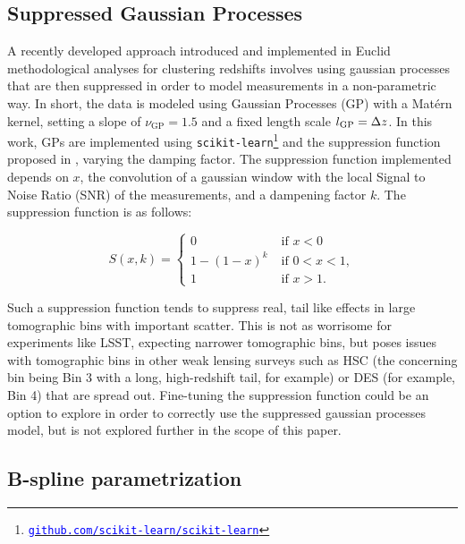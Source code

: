 \subsection{Suppressed Gaussian Processes}
\label{sec:parametrization:sgp}

A recently developed approach introduced and implemented in Euclid methodological analyses for clustering redshifts \cite{EuclidClusteringRedshifts2023, EuclidClusterRedshifts2025} involves using gaussian processes that are then suppressed in order to model measurements in a non-parametric way. In short, the data is modeled using Gaussian Processes (GP) with a Matérn kernel, setting a slope of $\nu_{\mathrm{GP}}=1.5$ and a fixed length scale $l_{\mathrm{GP}}=\Delta z$. In this work, GPs are implemented using \texttt{scikit-learn}\footnote{\href{https://github.com/scikit-learn/scikit-learn}{\textcolor{blue}{\texttt{github.com/scikit-learn/scikit-learn}}}} \cite{ScikitLearnPedregosa2011} and the suppression function proposed in \cite{EuclidClusteringRedshifts2023, EuclidClusterRedshifts2025}, varying the damping factor. The suppression function implemented depends on $x$, the convolution of a gaussian window with the local Signal to Noise Ratio (SNR) of the measurements, and a dampening factor $k$. The suppression function is as follows:

\begin{equation}\label{eq:suppression_function}
S(x, k) =
\begin{cases}
0 & \text{if } x < 0 \\
1 - (1 - x)^k\; & \text{if } 0 < x < 1, \\
1 & \text{if } x > 1.
\end{cases}
\end{equation}

Such a suppression function tends to suppress real, tail like effects in large tomographic bins with important scatter. This is not as worrisome for experiments like LSST, expecting narrower tomographic bins, but poses issues with tomographic bins in other weak lensing surveys such as HSC (the concerning bin being Bin 3 with a long, high-redshift tail, for example) \cite{HSCClusteringRau2023} or DES (for example, Bin 4) \cite{Gatti2021ClusteringDESWLsrcDistrib} that are spread out. Fine-tuning the suppression function could be an option to explore in order to correctly use the suppressed gaussian processes model, but is not explored further in the scope of this paper.

\subsection{B-spline parametrization}
\label{sec:parametrization:bspline}


